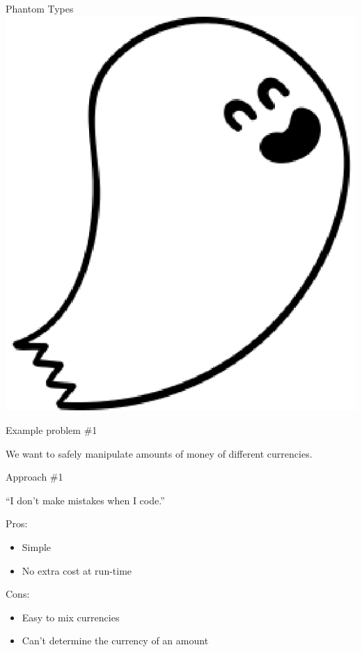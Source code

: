 \documentclass[11pt]{beamer}
\renewcommand\big[1]{
  \begin{center}
    \Large{#1}
  \end{center}
}
\begin{document}
\begin{frame}
  \begin{center}
    \Huge{Phantom Types}
    \vskip1cm
    \includegraphics[scale=0.5]{phantom.eps}
  \end{center}
\end{frame}


\begin{frame}
  \big{Example problem \#1}

  \begin{center}
    We want to safely manipulate amounts of money of different currencies.
  \end{center}
\end{frame}

\begin{frame}
  \big{Approach \#1}
  \centering``I don't make mistakes when I code.''
  \pause
  \vskip1cm
  \begin{minipage}[t]{.48\textwidth}
    Pros:
    \footnotesize
    \begin{itemize}
      \item Simple
      \item No extra cost at run-time
    \end{itemize}
  \end{minipage}
  \begin{minipage}[t]{.48\textwidth}
    Cons:
    \footnotesize
    \begin{itemize}
      \item Easy to mix currencies
      \item Can't determine the currency of an amount
    \end{itemize}
  \end{minipage}
\end{frame}
\end{document}

